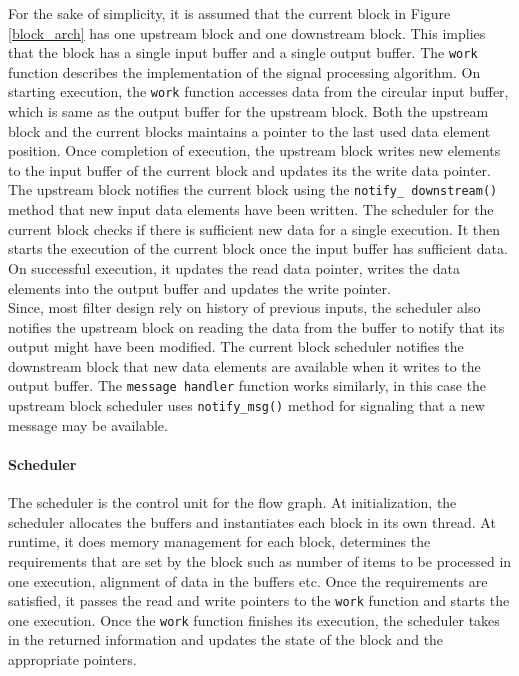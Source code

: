 For the sake of simplicity, it is assumed that the current block in Figure \ref{block_arch} has one upstream block and one downstream block.
This implies that the block has a single input buffer and a single output buffer.
The \texttt{work} function describes the implementation of the signal processing algorithm.
On starting execution, the \texttt{work} function accesses data from the circular input buffer, which is same as the output buffer for the upstream block.
Both the upstream block and the current blocks maintains a pointer to the last used data element position. 
Once completion of execution, the upstream block writes new elements to the input buffer of the current block and updates its the write data pointer.
The upstream block notifies the current block using the \texttt{notify\_ downstream()} method that new input data elements have been written.
The scheduler for the current block checks if there is sufficient new data for a single execution.
It then starts the execution of the current block once the input buffer has sufficient data.
On successful execution, it updates the read data pointer, writes the data elements into the output buffer and updates the write pointer.\\

Since, most filter design rely on history of previous inputs, the scheduler also notifies the upstream block on reading the data from the buffer to notify that its output might have been modified.
The current block scheduler notifies the downstream block that new data elements are available when it writes to the output buffer.
The \texttt{message handler} function works similarly, in this case the upstream block scheduler uses \texttt{notify\_msg()} method for signaling that a new message may be available.\\



\paragraph{Scheduler}
The scheduler is the control unit for the flow graph.
At initialization, the scheduler allocates the buffers and instantiates each block in its own thread.
At runtime, it does memory management for each block, determines the requirements that are set by the block such as number of items to be processed in one execution, alignment of data in the buffers etc.
Once the requirements are satisfied, it passes the read and write pointers to the \texttt{work} function and starts the one execution.
Once the \texttt{work} function finishes its execution, the scheduler takes in the returned information and updates the state of the block and the appropriate pointers.\\


